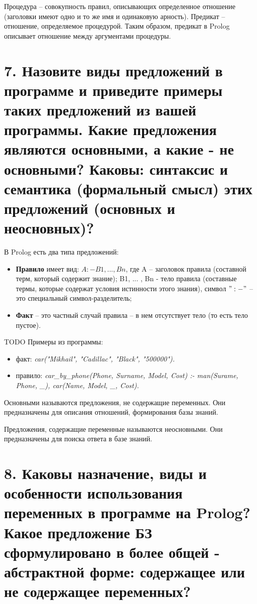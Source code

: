 \documentclass[12pt]{report}
\begin{document}
Процедура -- совокупность правил, описывающих определенное отношение (заголовки имеют одно и то же имя и одинаковую арность). Предикат -- отношение, определяемое процедурой. Таким образом, предикат в Prolog описывает отношение между аргументами процедуры. 

\section*{7. Назовите виды предложений в программе и приведите примеры таких предложений из вашей программы. Какие предложения являются основными, а какие - не основными? Каковы: синтаксис и семантика (формальный смысл) этих предложений (основных и неосновных)?}

В Prolog есть два типа предложений: 
\begin{itemize}
	\item \textbf{Правило} имеет вид: $A :- B1, ... , Bn$, где A -- заголовок правила (составной терм, который содержит знание); B1, ... , Bn - тело правила (составные термы, которые содержат условия истинности этого знания), символ $":-"$ -- это специальный символ-разделитель;
	\item \textbf{Факт} -- это частный случай правила -- в нем отсутствует тело (то есть тело пустое).
\end{itemize}



TODO 
Примеры из программы:
\begin{itemize}
	\item факт: \emph{car("Mikhail"{}, "Cadillac"{}, "Black"{}, "500000"). }
	\item правило: \emph{car\_by\_phone(Phone, Surname, Model, Cost) :- man(Surame, Phone, \_), car(Name, Model, \_, Cost). }
\end{itemize}



Основными называются предложения, не содержащие переменных. Они предназначены для описания отношений, формирования базы знаний. 

Предложения, содержащие переменные называются неосновными. Они предназначены для поиска ответа в базе знаний.



\section*{8. Каковы назначение, виды и особенности использования переменных в программе на Prolog? Какое предложение БЗ сформулировано в более общей - абстрактной форме: содержащее или не содержащее переменных?}
\end{document}

